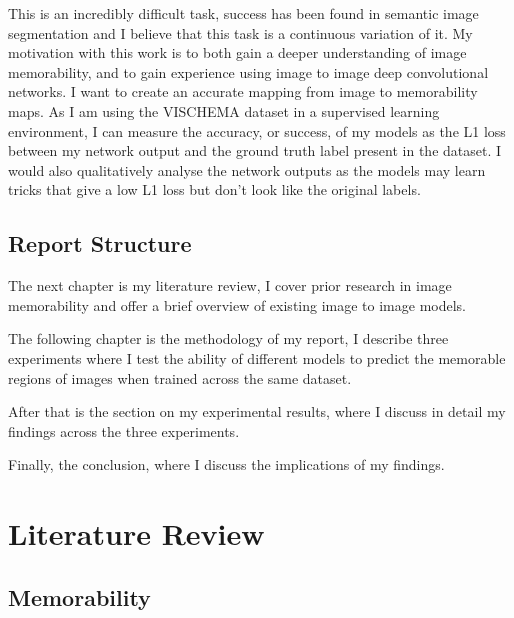 \documentclass{UoYCSproject}
\begin{document}


This is an incredibly difficult task, success has been found in semantic image segmentation \cite{wang2023internimage} and I believe that this task is a continuous variation of it. My motivation with this work is to both gain a deeper understanding of image memorability, and to gain experience using image to image deep convolutional networks. I want to create an accurate mapping from image to memorability maps. As I am using the VISCHEMA dataset in a supervised learning environment, I can measure the accuracy, or success, of my models as the L1 loss between my network output and the ground truth label present in the dataset. I would also qualitatively analyse the network outputs as the models may learn tricks that give a low L1 loss but don't look like the original labels.

\section{Report Structure}

The next chapter is my literature review, I cover prior research in image memorability and offer a brief overview of existing image to image models.

The following chapter is the methodology of my report, I describe three experiments where I test the ability of different models to predict the memorable regions of images when trained across the same dataset.

After that is the section on my experimental results, where I discuss in detail my findings across the three experiments.

Finally, the conclusion, where I discuss the implications of my findings.

\chapter{Literature Review}


\section{Memorability}

\end{document}
